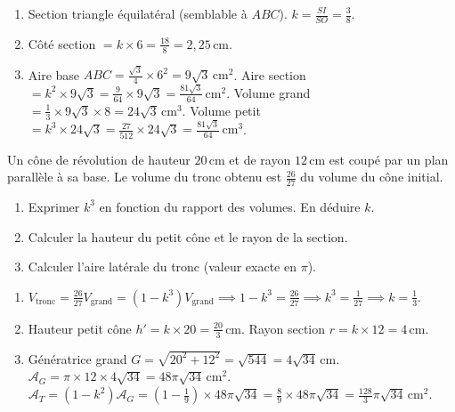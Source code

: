 \documentclass[11pt]{article}
\begin{document}
\begin{corrige}[Exercice 1]
    \begin{enumerate}
        \item Section triangle équilatéral (semblable à $ABC$). $k = \frac{SI}{SO} = \frac{3}{8}$.
        \item Côté section $= k \times 6 = \frac{18}{8} = 2,25\,\text{cm}$.
        \item Aire base $ABC = \frac{\sqrt{3}}{4} \times 6^2 = 9\sqrt{3}\,\text{cm}^2$. Aire section $= k^2 \times 9\sqrt{3} = \frac{9}{64} \times 9\sqrt{3} = \frac{81\sqrt{3}}{64}\,\text{cm}^2$.
            Volume grand $= \frac{1}{3} \times 9\sqrt{3} \times 8 = 24\sqrt{3}\,\text{cm}^3$.
            Volume petit $= k^3 \times 24\sqrt{3} = \frac{27}{512} \times 24\sqrt{3} = \frac{81\sqrt{3}}{64}\,\text{cm}^3$.
    \end{enumerate}
\end{corrige}

\begin{exercice}
    Un cône de révolution de hauteur $20\,\text{cm}$ et de rayon $12\,\text{cm}$ est coupé par un plan parallèle à sa base. Le volume du tronc obtenu est $\frac{26}{27}$ du volume du cône initial.
    \begin{enumerate}
        \item Exprimer $k^3$ en fonction du rapport des volumes. En déduire $k$.
        \item Calculer la hauteur du petit cône et le rayon de la section.
        \item Calculer l'aire latérale du tronc (valeur exacte en $\pi$).
    \end{enumerate}
\end{exercice}

\begin{corrige}[Exercice 2]
    \begin{enumerate}
        \item $V_{\text{tronc}} = \frac{26}{27} V_{\text{grand}} = (1-k^3)V_{\text{grand}} \implies 1-k^3 = \frac{26}{27} \implies k^3 = \frac{1}{27} \implies k = \frac{1}{3}$.
        \item Hauteur petit cône $h' = k \times 20 = \frac{20}{3}\,\text{cm}$. Rayon section $r = k \times 12 = 4\,\text{cm}$.
        \item Génératrice grand $G = \sqrt{20^2+12^2} = \sqrt{544} = 4\sqrt{34}\,\text{cm}$.
            $\mathcal{A}_G = \pi \times 12 \times 4\sqrt{34} = 48\pi\sqrt{34}\,\text{cm}^2$.
            $\mathcal{A}_T = (1-k^2)\mathcal{A}_G = \left(1-\frac{1}{9}\right) \times 48\pi\sqrt{34} = \frac{8}{9} \times 48\pi\sqrt{34} = \frac{128}{3}\pi\sqrt{34}\,\text{cm}^2$.
    \end{enumerate}
\end{corrige}
\end{document}
